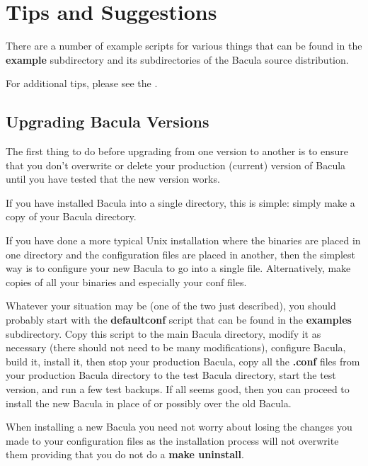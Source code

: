 
\chapter{Tips and Suggestions}
\label{TipsChapter}
\label{examples}

There are a number of example scripts for various things that can be found in
the {\bf example} subdirectory and its subdirectories of the Bacula source
distribution.

For additional tips, please see the .

\section{Upgrading Bacula Versions}
\label{upgrading}

The first thing to do before upgrading from one version to another is to
ensure that you don't overwrite or delete your production (current) version
of Bacula until you have tested that the new version works.

If you have installed Bacula into a single directory, this is simple: simply
make a copy of your Bacula directory.

If you have done a more typical Unix installation where the binaries are
placed in one directory and the configuration files are placed in another,
then the simplest way is to configure your new Bacula to go into a single
file. Alternatively, make copies of all your binaries and especially your
conf files.

Whatever your situation may be (one of the two just described), you should
probably start with the {\bf defaultconf} script that can be found in the {\bf
examples} subdirectory. Copy this script to the main Bacula directory, modify
it as necessary (there should not need to be many modifications), configure
Bacula, build it, install it, then stop your production Bacula, copy all the
{\bf *.conf} files from your production Bacula directory to the test Bacula
directory, start the test version, and run a few test backups. If all seems
good, then you can proceed to install the new Bacula in place of or possibly
over the old Bacula.

When installing a new Bacula you need not worry about losing the changes you
made to your configuration files as the installation process will not
overwrite them providing that you do not do a {\bf make uninstall}.

